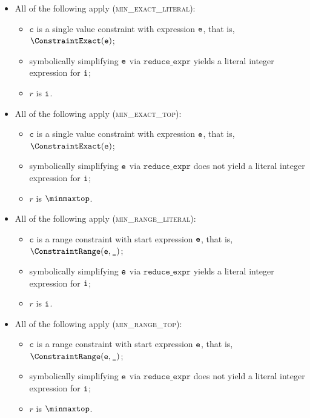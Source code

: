 \documentclass{book}
\newcommand\reduceexpr[0]{\texttt{reduce\_expr}}
\newcommand\vc[0]{\texttt{c}}
\begin{document}
\begin{itemize}
  \item All of the following apply (\textsc{min\_exact\_literal}):
  \begin{itemize}
    \item $\vc$ is a single value constraint with expression $\texttt{e}$, that is, $\ConstraintExact(\ve)$;
    \item symbolically simplifying $\texttt{e}$ via $\reduceexpr$ yields a literal integer expression for $\texttt{i}$;
    \item $r$ is $\texttt{i}$.
  \end{itemize}

  \item All of the following apply (\textsc{min\_exact\_top}):
  \begin{itemize}
    \item $\vc$ is a single value constraint with expression $\texttt{e}$, that is, $\ConstraintExact(\ve)$;
    \item symbolically simplifying $\texttt{e}$ via $\reduceexpr$ does not yield a literal integer expression for $\texttt{i}$;
    \item $r$ is $\minmaxtop$.
  \end{itemize}

  \item All of the following apply (\textsc{min\_range\_literal}):
  \begin{itemize}
    \item $\vc$ is a range constraint with start expression $\texttt{e}$, that is, $\ConstraintRange(\ve, \Ignore)$;
    \item symbolically simplifying $\texttt{e}$ via $\reduceexpr$ yields a literal integer expression for $\texttt{i}$;
    \item $r$ is $\texttt{i}$.
  \end{itemize}

  \item All of the following apply (\textsc{min\_range\_top}):
  \begin{itemize}
    \item $\vc$ is a range constraint with start expression $\texttt{e}$, that is, $\ConstraintRange(\ve, \Ignore)$;
    \item symbolically simplifying $\texttt{e}$ via $\reduceexpr$ does not yield a literal integer expression for $\texttt{i}$;
    \item $r$ is $\minmaxtop$.
  \end{itemize}
\end{itemize}
\end{document}
